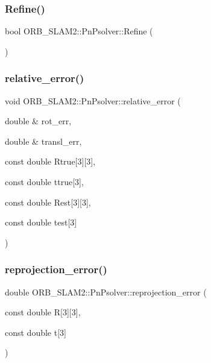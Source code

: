 \subsubsection{\texorpdfstring{Refine()}{Refine()}}
{\footnotesize\ttfamily bool O\+R\+B\+\_\+\+S\+L\+A\+M2\+::\+Pn\+Psolver\+::\+Refine (\begin{DoxyParamCaption}{ }\end{DoxyParamCaption})\hspace{0.3cm}{\ttfamily [private]}}

\mbox{\label{class_o_r_b___s_l_a_m2_1_1_pn_psolver_ab3247415c8c4ff0a5df74096907eac10}} 
\subsubsection{\texorpdfstring{relative\+\_\+error()}{relative\_error()}}
{\footnotesize\ttfamily void O\+R\+B\+\_\+\+S\+L\+A\+M2\+::\+Pn\+Psolver\+::relative\+\_\+error (\begin{DoxyParamCaption}\item[{double \&}]{rot\+\_\+err,  }\item[{double \&}]{transl\+\_\+err,  }\item[{const double}]{Rtrue\mbox{[}3\mbox{]}\mbox{[}3\mbox{]},  }\item[{const double}]{ttrue\mbox{[}3\mbox{]},  }\item[{const double}]{Rest\mbox{[}3\mbox{]}\mbox{[}3\mbox{]},  }\item[{const double}]{test\mbox{[}3\mbox{]} }\end{DoxyParamCaption})\hspace{0.3cm}{\ttfamily [private]}}

\mbox{\label{class_o_r_b___s_l_a_m2_1_1_pn_psolver_a8d0ecb37dd35686ae16ff2cdb277cd82}} 
\subsubsection{\texorpdfstring{reprojection\+\_\+error()}{reprojection\_error()}}
{\footnotesize\ttfamily double O\+R\+B\+\_\+\+S\+L\+A\+M2\+::\+Pn\+Psolver\+::reprojection\+\_\+error (\begin{DoxyParamCaption}\item[{const double}]{R\mbox{[}3\mbox{]}\mbox{[}3\mbox{]},  }\item[{const double}]{t\mbox{[}3\mbox{]} }\end{DoxyParamCaption})\hspace{0.3cm}{\ttfamily [private]}}

